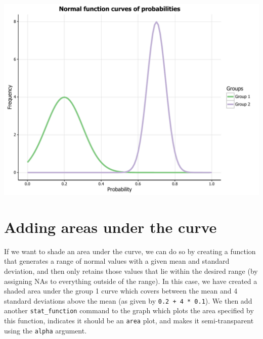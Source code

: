 \begin{Shaded}
\begin{Highlighting}[]
\StringTok{        }\NormalTok{(}\NormalTok{, } \NormalTok{), }
\StringTok{        } \NormalTok{(} \NormalTok{), }
\StringTok{        } \NormalTok{(), }
\StringTok{        } \NormalTok{(), } \NormalTok{(),}
\StringTok{        } \NormalTok{(} \NormalTok{, } \NormalTok{, } \NormalTok{),}
\StringTok{        }\NormalTok{(}\NormalTok{))}
\end{Highlighting}
\end{Shaded}

\begin{center}\includegraphics[width=0.55\linewidth]{figures/function_16-1} \end{center}

\section{Adding areas under the
curve}\label{adding-areas-under-the-curve}

If we want to shade an area under the curve, we can do so by creating a
function that generates a range of normal values with a given mean and
standard deviation, and then only retains those values that lie within
the desired range (by assigning NAs to everything outside of the range).
In this case, we have created a shaded area under the group 1 curve
which covers between the mean and 4 standard deviations above the mean
(as given by \texttt{0.2\ +\ 4\ *\ 0.1}). We then add another
\texttt{stat\_function} command to the graph which plots the area
specified by this function, indicates it should be an \texttt{area}
plot, and makes it semi-transparent using the \texttt{alpha} argument.

